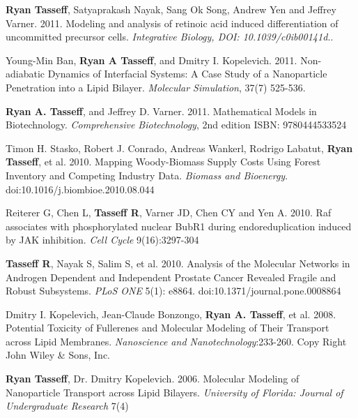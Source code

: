 \documentclass[margin,line]{res}
\begin{document}
\begin{resume}
{\bf Ryan Tasseff}, Satyaprakash Nayak, Sang Ok Song, Andrew Yen and Jeffrey Varner. 2011. 
Modeling and analysis of retinoic acid induced differentiation of uncommitted precursor cells.
{\it Integrative Biology, DOI: 10.1039/c0ib00141d.}. 

Young-Min Ban, {\bf Ryan A Tasseff}, and Dmitry I. Kopelevich. 2011.
Non-adiabatic Dynamics of Interfacial Systems: A Case Study of a Nanoparticle Penetration into a Lipid Bilayer.
{\it Molecular Simulation}, 37(7) 525-536. 

{\bf Ryan A. Tasseff}, and Jeffrey D. Varner. 2011.
Mathematical Models in Biotechnology.
{\it Comprehensive Biotechnology}, 2nd edition ISBN: 9780444533524

Timon H. Stasko, Robert J. Conrado, Andreas Wankerl, Rodrigo Labatut, {\bf Ryan Tasseff}, et al. 2010. 
Mapping Woody-Biomass Supply Costs Using Forest Inventory and Competing Industry Data. 
{\it Biomass and Bioenergy}.  doi:10.1016/j.biombioe.2010.08.044

Reiterer G, Chen L, {\bf Tasseff R}, Varner JD, Chen CY and Yen A. 2010.
Raf associates with phosphorylated nuclear BubR1 during endoreduplication 
induced by JAK inhibition.  
{\it Cell Cycle} 9(16):3297-304

{\bf Tasseff R}, Nayak S, Salim S, et al. 2010. 
Analysis of the Molecular Networks in Androgen Dependent and 
Independent Prostate Cancer Revealed Fragile and Robust Subsystems. 
{\it PLoS ONE} 5(1): e8864. doi:10.1371/journal.pone.0008864

Dmitry I. Kopelevich, Jean-Claude Bonzongo, {\bf Ryan A. Tasseff}, et al.
2008. Potential Toxicity of Fullerenes and Molecular Modeling of Their 
Transport across Lipid Membranes. 
{\it Nanoscience and Nanotechnology}:233-260. 
Copy Right John Wiley \& Sons, Inc.

{\bf Ryan Tasseff}, Dr. Dmitry Kopelevich. 2006. 
Molecular Modeling of Nanoparticle Transport 
across Lipid Bilayers.
{\it University of Florida: Journal of Undergraduate Research} 7(4)






\end{resume}
\end{document}
